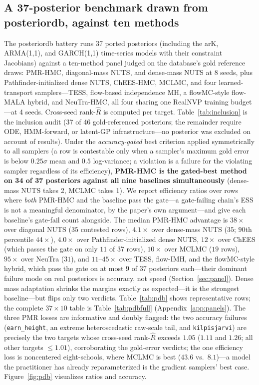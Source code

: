 \documentclass[11pt]{article}
\theoremstyle{remark}
\begin{document}
\subsection{A 37-posterior benchmark drawn from posteriordb, against
ten methods}
\label{sec:pdb}
The posteriordb battery runs 37 ported posteriors (including the arK,
ARMA(1,1), and GARCH(1,1) time-series models with their constraint
Jacobians) against a ten-method panel judged on the database's gold
reference draws: PMR-HMC, diagonal-mass NUTS, and dense-mass NUTS at 8
seeds, plus Pathfinder-initialized dense NUTS, ChEES-HMC, MCLMC, and
four learned-transport samplers---TESS, flow-based independence MH,
a flowMC-style flow-MALA hybrid, and NeuTra-HMC, all four sharing one
RealNVP training budget---at 4 seeds. Cross-seed rank-$\widehat R$ is
computed per target. Table~\ref{tab:inclusion} is the inclusion audit
(37 of 46 gold-referenced posteriors; the remainder require ODE,
HMM-forward, or latent-GP infrastructure---no posterior was excluded on
account of results). Under the \emph{accuracy-gated} best criterion
applied symmetrically to all samplers (a row is contestable only when a
sampler's maximum gold error is below $0.25\sigma$ mean and $0.5$
log-variance; a violation is a failure for the violating sampler
regardless of its efficiency), \textbf{PMR-HMC is the gated-best method
on 34 of 37 posteriors against all nine baselines simultaneously}
(dense-mass NUTS takes 2, MCLMC takes 1). We report efficiency ratios
over rows where \emph{both} PMR-HMC and the baseline pass the gate---a
gate-failing chain's ESS is not a meaningful denominator, by the
paper's own argument---and give each baseline's gate-fail count
alongside. The median PMR-HMC advantage is $38\times$ over diagonal
NUTS ($35$ contested rows), $4.1\times$ over dense-mass NUTS ($35$;
$90$th percentile $44\times$), $4.0\times$ over Pathfinder-initialized
dense NUTS, $12\times$ over ChEES (which passes the gate on only $11$
of 37 rows), $10\times$ over MCLMC ($19$ rows), $95\times$ over NeuTra
($31$), and $11$--$45\times$ over TESS, flow-IMH, and the
flowMC-style hybrid, which pass the gate on at most $9$ of 37
posteriors each---their dominant failure mode on real posteriors is
accuracy, not speed (Section~\ref{sec:panel}). Dense mass adaptation shrinks the
margins exactly as expected---it is the strongest baseline---but flips
only two verdicts. Table~\ref{tab:pdb} shows representative rows; the
complete $37\times10$ table is Table~\ref{tab:pdbfull}
(Appendix~\ref{app:panels}). The three PMR
losses are informative and doubly flagged: the two accuracy failures
(\texttt{earn\_height}, an extreme heteroscedastic raw-scale tail, and
\texttt{kilpisjarvi}) are precisely the two targets whose cross-seed
rank-$\widehat R$ exceeds $1.05$ ($1.11$ and $1.26$; all other targets
$\le1.01$), corroborating the gold-error verdicts; the one efficiency
loss is noncentered eight-schools, where MCLMC is best
($43.6$ vs.\ $8.1$)---a model the practitioner has already
reparameterized is the gradient samplers' best case.
Figure~\ref{fig:pdb} visualizes ratios and accuracy.
\end{document}
